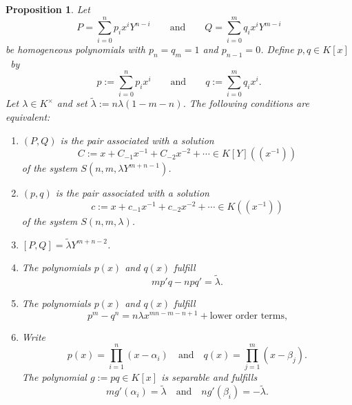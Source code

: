 \documentclass[reqno,a4paper]{amsart}
\newtheorem{proposition}[theorem]{Proposition}
\theoremstyle{definition}
\theoremstyle{remark}
\newcommand{\wt}{\widetilde}
\begin{document}
\begin{proposition}\label{proposicion} Let
$$
P=\sum_{i=0}^n p_i x^i Y^{n-i}\qquad\text{and}\qquad Q=\sum_{i=0}^m q_i x^i Y^{m-i}
$$
be homogeneous polynomials with $p_n = q_m = 1$ and $p_{n-1} = 0$. Define $p,q\in K[x]$~by
$$
p:=\sum_{i=0}^n p_i x^i\qquad\text{and}\qquad q:=\sum_{i=0}^m q_i x^i.
$$
Let $\lambda\in K^{\times}$ and set $\wt{\lambda}:=n\lambda(1-m-n)$. The following conditions are equivalent:
\begin{enumerate}

\smallskip

\item $(P,Q)$ is the pair associated with a solution
$$
C := x + C_{-1} x^{-1} + C_{-2} x^{-2} +\cdots \in K[Y]((x^{-1}))
$$
of the system $S(n,m,\lambda Y^{m+n-1})$.

\smallskip

\item $(p,q)$ is the pair associated with a solution
$$
c := x + c_{-1} x^{-1} + c_{-2} x^{-2} +\cdots \in K((x^{-1}))
$$
of the system $S(n,m,\lambda)$.

\smallskip

\item $[P,Q]=\wt{\lambda} Y^{m+n-2}$.

\smallskip

\item The polynomials $p(x)$ and $q(x)$ fulfill
%
\begin{equation}\label{equacionprincipal}
mp'q-npq'=\wt{\lambda}.
\end{equation}

\smallskip

\item The polynomials $p(x)$ and $q(x)$ fulfill
%
\begin{equation}\label{equacionpotencia}
p^m-q^n = n\lambda x^{mn-m-n+1}+\text{lower order terms,}
\end{equation}

\smallskip

\item Write
$$
p(x)= \prod_{i=1}^n (x-\alpha_i)\quad \text{and}\quad q(x)= \prod_{j=1}^m (x-\beta_j).
$$
The polynomial $g:=pq\in K[x]$ is separable and fulfills
\begin{equation}\label{equacionsymmetrica}
m g'(\alpha_i)=\wt{\lambda}\quad\text{and}\quad n g'(\beta_i)= -\wt{\lambda}.
\end{equation}

\smallskip

\end{enumerate}
\end{proposition}
\end{document}
